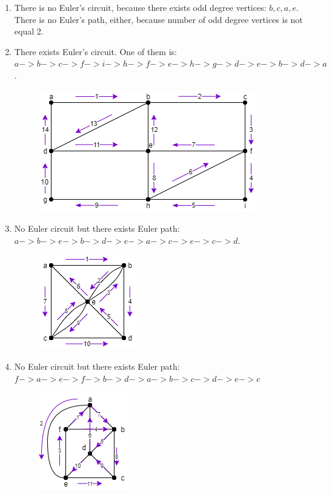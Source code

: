 \documentclass[a4paper]{article}
\begin{document}
	\begin{enumerate}[label = \alph*)]
		\item There is no Euler's circuit, because there exists odd degree vertices: $b, c, a, e$. \\
		      There is no Euler's path, either, because number of odd degree vertices is not equal 2.
		\item There exists Euler's circuit. One of them is: $a -> b -> c -> f -> i -> h -> f -> e -> h -> g -> d -> e -> b -> d -> a$.
		      \begin{figure}[H]
			      \centering
			      \includegraphics[width= 0.5 \textwidth]{tut912_7.png}
		      \end{figure}
		\item No Euler circuit but there exists Euler path: $a -> b -> e -> b ->d -> e -> a -> c -> e -> c ->d$.
		      \begin{figure}[H]
			      \centering
			      \includegraphics[width= 0.3 \textwidth]{tut912_8.png}
		      \end{figure}
		\item No Euler circuit but there exists Euler path: $f -> a -> e -> f -> b ->d -> a -> b -> c -> d -> e ->c$
		      \begin{figure}[H]
			      \centering
			      \includegraphics[width= 0.3 \textwidth]{tut912_9.png}

\end{figure}
\end{enumerate}
\end{document}
